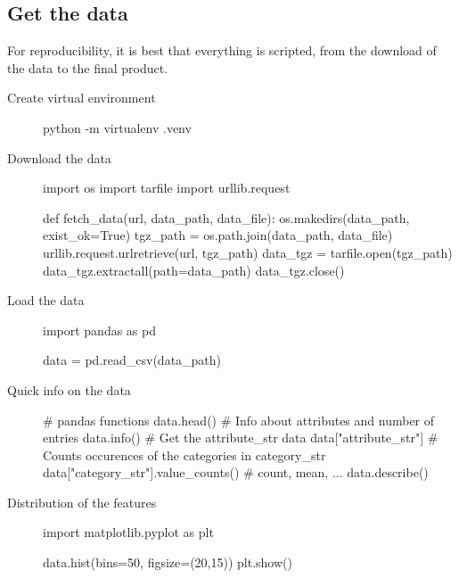 \documentclass{article}
\begin{document}
\subsection{Get the data}
For reproducibility, it is best that everything is scripted, from the download of the data to the final product.

\begin{description}
  \item [Create virtual environment] \hfill
    \begin{python}
      python -m virtualenv .venv
    \end{python}
  \item [Download the data] \hfill
    \begin{python}
      import os
      import tarfile
      import urllib.request

      def fetch_data(url, data_path, data_file):
        os.makedirs(data_path, exist_ok=True)
        tgz_path = os.path.join(data_path, data_file)
        urllib.request.urlretrieve(url, tgz_path)
        data_tgz = tarfile.open(tgz_path)
        data_tgz.extractall(path=data_path)
        data_tgz.close()
    \end{python}

  \item [Load the data] \hfill
    \begin{python}
      import pandas as pd

      data = pd.read_csv(data_path)
    \end{python}

  \item [Quick info on the data] \hfill
    \begin{python}
      # pandas functions
      data.head()
      # Info about attributes and number of entries
      data.info()
      # Get the attribute_str data
      data["attribute_str"]
      # Counts occurences of the categories in category_str
      data["category_str"].value_counts()
      # count, mean, ...
      data.describe()
    \end{python}

    \item [Distribution of the features] \hfill
    \begin{python}
      import matplotlib.pyplot as plt

      data.hist(bins=50, figsize=(20,15))
      plt.show()
    \end{python}
\end{description}
\end{document}
